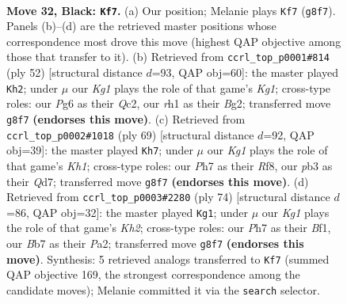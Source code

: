 \documentclass[11pt]{article}
\begin{document}
\clearpage

\begin{figure}[p]\centering
\begin{subfigure}{0.46\textwidth}\centering
\resizebox{\linewidth}{!}{%
\newchessgame
\chessboard[
  setfen={6kr/pbr1b2p/n1q3pP/1p1p1pP1/3P1P2/1P2P1N1/8/R2QKBNR b KQ - 11 32},
  showmover=false,
  pgfstyle=straightmove, color=movearrow, markmove={g8-f7}
]}
\caption{}
\end{subfigure}\hfill
\begin{subfigure}{0.46\textwidth}\centering
\resizebox{\linewidth}{!}{%
\newchessgame
\chessboard[
  setfen={2rq2rk/2pb1p1p/1p1p1n2/p2PpP2/2P5/PPN2RPP/2Q3B1/5RK1 w - - 1 27},
  showmover=false,
  pgfstyle=straightmove, color=movearrow, markmove={g1-h2}
]}
\caption{}
\end{subfigure}
\\[4pt]
\begin{subfigure}{0.46\textwidth}\centering
\resizebox{\linewidth}{!}{%
\newchessgame
\chessboard[
  setfen={1r3r1k/1b1qnpp1/3p1b1p/Rpp1p2P/4P3/1BPPNNP1/1P3P2/R2Q2K1 b - - 2 35},
  showmover=false,
  pgfstyle=straightmove, color=movearrow, markmove={h8-h7}
]}
\caption{}
\end{subfigure}\hfill
\begin{subfigure}{0.46\textwidth}\centering
\resizebox{\linewidth}{!}{%
\newchessgame
\chessboard[
  setfen={1q2r3/rbpn1pbk/1p1p2p1/3N3p/p1P1P3/4BPPP/PP1Q1R1K/3R1B2 w - - 7 38},
  showmover=false,
  pgfstyle=straightmove, color=movearrow, markmove={h2-g1}
]}
\caption{}
\end{subfigure}
\caption{\textbf{Move 32, Black: \texttt{Kf7}.} (a) Our position; Melanie plays \texttt{Kf7} (\texttt{g8f7}). Panels (b)--(d) are the retrieved master positions whose correspondence most drove this move (highest QAP objective among those that transfer to it). (b) Retrieved from \texttt{ccrl\_top\_p0001\#814} (ply 52) [structural distance $d$=93, QAP obj=60]: the master played \texttt{Kh2}; under $\mu$ our \emph{Kg1} plays the role of that game's \emph{Kg1}; cross-type roles: our \emph{P}g6 as their \emph{Q}c2, our \emph{r}h1 as their \emph{B}g2; transferred move \texttt{g8f7} \textbf{(endorses this move)}. (c) Retrieved from \texttt{ccrl\_top\_p0002\#1018} (ply 69) [structural distance $d$=92, QAP obj=39]: the master played \texttt{Kh7}; under $\mu$ our \emph{Kg1} plays the role of that game's \emph{Kh1}; cross-type roles: our \emph{P}h7 as their \emph{R}f8, our \emph{p}b3 as their \emph{Q}d7; transferred move \texttt{g8f7} \textbf{(endorses this move)}. (d) Retrieved from \texttt{ccrl\_top\_p0003\#2280} (ply 74) [structural distance $d$=86, QAP obj=32]: the master played \texttt{Kg1}; under $\mu$ our \emph{Kg1} plays the role of that game's \emph{Kh2}; cross-type roles: our \emph{P}h7 as their \emph{B}f1, our \emph{B}b7 as their \emph{P}a2; transferred move \texttt{g8f7} \textbf{(endorses this move)}. Synthesis: 5 retrieved analogs transferred to \texttt{Kf7} (summed QAP objective 169, the strongest correspondence among the candidate moves); Melanie committed it via the \texttt{search} selector.}
\label{fig:thought-m63}
\end{figure}
\end{document}
